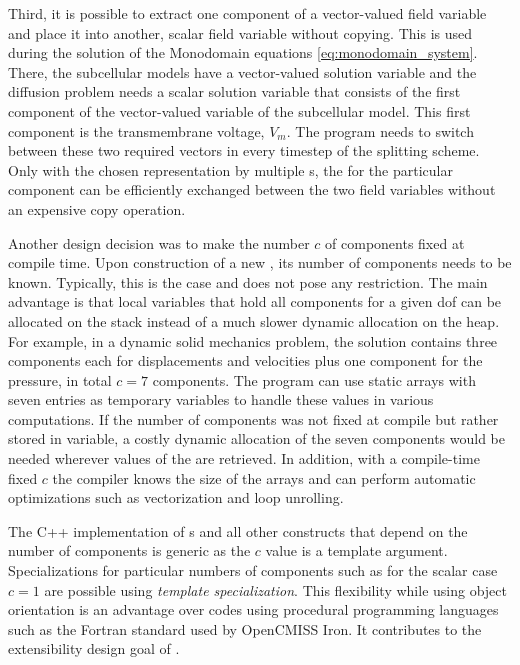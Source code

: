 Third, it is possible to extract one component of a vector-valued field variable and place it into another, scalar field variable without copying. This is used during the solution of the Monodomain equations \cref{eq:monodomain_system}. There, the subcellular models have a vector-valued solution variable and the diffusion problem needs a scalar solution variable that consists of the first component of the vector-valued variable of the subcellular model. This first component is the transmembrane voltage, $V_m$. The program needs to switch between these two required vectors in every timestep of the splitting scheme. Only with the chosen representation by multiple \Vec{}s, the \Vec{} for the particular component can be efficiently exchanged between the two field variables without an expensive copy operation.

Another design decision was to make the number $c$ of components fixed at compile time. 
Upon construction of a new , its number of components needs to be known. Typically, this is the case and does not pose any restriction.
The main advantage is that local variables that hold all components for a given dof can be allocated on the stack instead of a much slower dynamic allocation on the heap. For example, in a dynamic solid mechanics problem, the solution  contains three components each for displacements and velocities plus one component for the pressure, in total $c=7$ components. The program can use static arrays with seven entries as temporary variables to handle these values in various computations. If the number of components was not fixed at compile but rather stored in variable, a costly dynamic allocation of the seven components would be needed wherever values of the  are retrieved. 
In addition, with a compile-time fixed $c$ the compiler knows the size of the arrays and can perform automatic optimizations such as vectorization and loop unrolling.

The C++ implementation of s and all other constructs that depend on the number of components is generic as the  $c$ value is a template argument. Specializations for particular numbers of components such as for the scalar case $c=1$ are possible using \emph{template specialization}.
This flexibility while using object orientation is an advantage over codes using procedural programming languages such as the Fortran standard used by OpenCMISS Iron. It contributes to the extensibility design goal of \opendihu.

